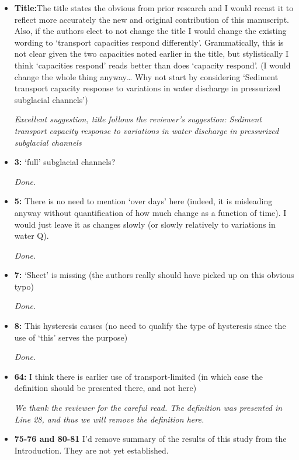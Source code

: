 \documentclass[11pt]{article}
\begin{document}
\begin{itemize}
\item \textbf{Title:}The title states the obvious from prior research and I would recast it to
  reflect more accurately the new and original contribution of this
  manuscript. Also, if the authors elect to not change the title I would change
  the existing wording to ‘transport capacities respond differently’.
  Grammatically, this is not clear given the two capacities noted earlier in the
  title, but stylistically I think ‘capacities respond’ reads better than does
  ‘capacity respond’. (I would change the whole thing anyway… Why not start
  by considering ‘Sediment transport capacity response to variations in water
  discharge in pressurized subglacial channels’)

  \textit{Excellent suggestion, title follows the reviewer's suggestion: Sediment transport capacity response to variations in water discharge in pressurized subglacial channels}
  
\item \textbf{3:} ‘full’ subglacial channels?

  \textit{Done.}
  
\item \textbf{5:} There is no need to mention ‘over days’ here (indeed, it is misleading
  anyway without quantification of how much change as a function of time).
  I would just leave it as changes slowly (or slowly relatively to variations in
  water Q).

  \textit{Done.}

\item \textbf{7:} ‘Sheet’ is missing (the authors really should have picked up on this obvious
  typo)

  \textit{Done.}

  
\item \textbf{8:} This hysteresis causes (no need to qualify the type of hysteresis since the
  use of ‘this’ serves the purpose)

  \textit{Done.}

  
\item \textbf{64:} I think there is earlier use of transport-limited (in which case the definition
  should be presented there, and not here)

  \textit{We thank the reviewer for the careful read. The definition was presented in Line 28, and thus we will remove the definition here.}


\item \textbf{75-76 and 80-81} I’d remove summary of the results of this study from the Introduction. They
  are not yet established.


\end{itemize}
\end{document}
